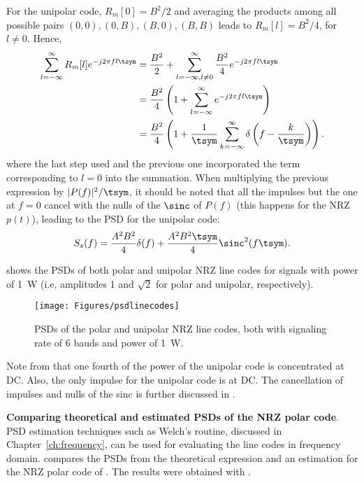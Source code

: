 For the unipolar code, $R_m[0]=B^2/2$ and averaging the products among all possible pairs $(0,0),(0,B),(B,0),(B,B)$ leads to $R_m[l]=B^2/4$, for $l \ne 0$.
Hence,
\begin{align}
\sum_{l=-\infty}^{\infty} R_m[l] e^{-j 2 \pi f l \tsym} &= \frac{B^2}{2} + \sum^{\infty}_{l=-\infty,l \ne 0} \frac{B^2}{4} e^{-j 2 \pi f l \tsym} \nonumber \\
&= \frac{B^2}{4} \left( 1 + \sum^{\infty}_{l=-\infty} e^{-j 2 \pi f l \tsym} \right) \nonumber \\
&= \frac{B^2}{4} \left( 1 + \frac{1}{\tsym} \sum^{\infty}_{k=-\infty} \delta \left( f - \frac{k}{\tsym} \right) \right).
\label{eq:unipolarPSDParcel}
\end{align}
where the last step used  and the previous one incorporated the 
term corresponding to $l=0$ into the summation.
When multiplying the previous expression by $|P(f)|^2/\tsym$, it should be noted that all the impulses but the one at $f=0$ cancel with the nulls of the $\sinc$ of $P(f)$ (this happens for the NRZ $p(t)$), leading to the PSD for the unipolar code:
\[
S_s(f) =  \frac{A^2 B^2} 4 \delta(f) + \frac{A^2 B^2 \tsym} 4 \sinc^2(f \tsym).
\]

 shows the PSDs of both polar and unipolar NRZ line codes for signals with power of 1~W (i.e, amplitudes 1 and $\sqrt{2}$ for polar and unipolar, respectively).

\begin{figure}[htbp]
\centering
\texttt{[image: Figures/psdlinecodes]}
\caption[{PSDs of the polar and unipolar NRZ line codes, both with signaling rate of 6 bauds.}]{PSDs of the polar and unipolar NRZ line codes, both with signaling rate of 6 bauds and power of 1~W.\label{fig:psdlinecodes}}
\end{figure}

Note from  that one fourth of the power of the unipolar code
is concentrated at DC. Also, the only impulse for the unipolar code is at DC.
The cancellation of impulses and nulls of the sinc is further discussed in .
\eExample

\bExample \textbf{Comparing theoretical and estimated PSDs of the NRZ polar code}. 
PSD estimation techniques such as Welch's routine, discussed in Chapter~\ref{ch:frequency}, can
be used for evaluating the line codes in frequency domain.
 compares the PSDs from the theoretical expression  and an estimation for the NRZ polar code of . The results were obtained with .

